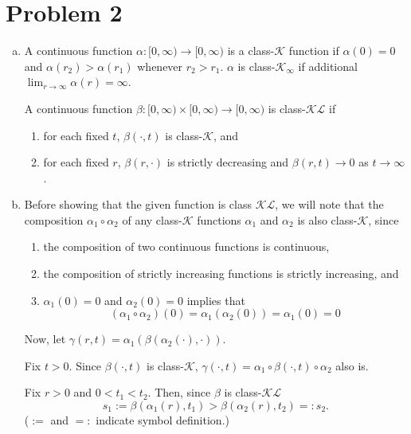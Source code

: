 \documentclass{homework}
\begin{document}
\section{Problem 2}
\begin{enumerate}[(a)]
\item A continuous function $\alpha: [0, \infty) \to [0, \infty)$ is a
class-$\mathcal{K}$ function if $\alpha(0) = 0$ and $\alpha(r_2) > \alpha(r_1)$
whenever $r_2 > r_1$. $\alpha$ is class-$\mathcal{K}_\infty$ if additional
$\lim_{r\to\infty} \alpha(r) = \infty$.

A continuous function $\beta: [0, \infty) \times [0, \infty) \to [0, \infty)$
is class-$\mathcal{K}\mathcal{L}$ if
\begin{enumerate}[(1)]
    \item for each fixed $t$, $\beta(\cdot, t)$ is class-$\mathcal{K}$, and
    \item for each fixed $r$, $\beta(r, \cdot)$ is strictly decreasing and
        $\beta(r, t) \to 0$ as $t \to \infty$.
\end{enumerate}

\item Before showing that the given function is class $\mathcal{K}\mathcal{L}$,
we will note that the composition $\alpha_1 \circ \alpha_2$ of any class-$\mathcal{K}$
functions $\alpha_1$ and $\alpha_2$ is also class-$\mathcal{K}$, since
\begin{enumerate}[(1)]
    \item the composition of two continuous functions is continuous,
    \item the composition of strictly increasing functions is strictly increasing, and
    \item $\alpha_1(0) = 0$ and $\alpha_2(0) = 0$ implies that
    \begin{equation*}
        (\alpha_1 \circ \alpha_2)(0) = \alpha_1(\alpha_2(0)) = \alpha_1(0) = 0
    \end{equation*}
\end{enumerate}

Now, let $\gamma(r, t) = \alpha_1(\beta(\alpha_2(\cdot), \cdot))$.

Fix $t>0$. Since $\beta(\cdot, t)$ is class-$\mathcal{K}$,
$\gamma(\cdot, t) = \alpha_1 \circ \beta(\cdot, t) \circ \alpha_2$ also is.

Fix $r>0$ and $0 < t_1 < t_2$. Then, since $\beta$ is class-$\mathcal{K}\mathcal{L}$
\begin{equation*}
    s_1 := \beta(\alpha_1(r), t_1) > \beta(\alpha_2(r), t_2) =: s_2.
\end{equation*}
($:=$ and $=:$ indicate symbol definition.)


\end{enumerate}
\end{document}
